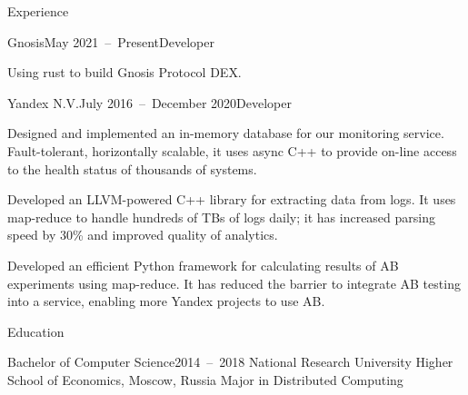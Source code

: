 \documentclass{resume}
\begin{document}
    \begin{rSection}{Experience}
        \begin{rSubsection}{Gnosis}{May 2021~--~Present}{Developer}{}
            \item Using rust to build Gnosis Protocol DEX\@.
        \end{rSubsection}

        \begin{rSubsection}{Yandex N.V.}{July 2016~--~December 2020}{Developer}{}
            \item
                Designed and implemented an in-memory database
                for our monitoring service.
                Fault-tolerant, horizontally scalable,
                it uses async C++ to provide on-line access
                to the health status of thousands of systems.
            \item
                Developed an LLVM-powered C++ library
                for extracting data from logs.
                It uses map-reduce to handle hundreds of TBs of logs daily;
                it has increased parsing speed
                by 30\% and improved quality of analytics.
            \item
                Developed an efficient Python framework
                for calculating results of AB experiments using map-reduce.
                It has reduced the barrier
                to integrate AB testing into a service,
                enabling more Yandex projects to use AB\@.
        \end{rSubsection}
    \end{rSection}

    \begin{rSection}{Education}
        \begin{rSubsection}{Bachelor of Computer Science}{2014~--~2018}
        {National Research University Higher School of Economics, Moscow, Russia}{}
            Major in Distributed Computing
        \end{rSubsection}
    \end{rSection}
\end{document}
